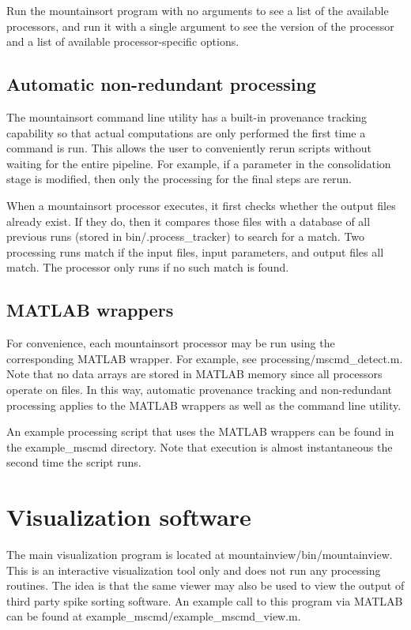\documentclass[hidelinks,10pt]{article}
\begin{document}
Run the mountainsort program with no arguments to see a list of the available processors, and run it with a single argument to see the version of the processor and a list of available processor-specific options.

\subsection {Automatic non-redundant processing}

The mountainsort command line utility has a built-in provenance tracking capability so that actual computations are only performed the first time a command is run. This allows the user to conveniently rerun scripts without waiting for the entire pipeline. For example, if a parameter in the consolidation stage is modified, then only the processing for the final steps are rerun.

When a mountainsort processor executes, it first checks whether the output files already exist. If they do, then it compares those files with a database of all previous runs (stored in bin/.process\_tracker) to search for a match. Two processing runs match if the input files, input parameters, and output files all match. The processor only runs if no such match is found.

\subsection {MATLAB wrappers}

For convenience, each mountainsort processor may be run using the corresponding MATLAB wrapper. For example, see processing/mscmd\_detect.m. Note that no data arrays are stored in MATLAB memory since all processors operate on files. In this way, automatic provenance tracking and non-redundant processing applies to the MATLAB wrappers as well as the command line utility.

An example processing script that uses the MATLAB wrappers can be found in the example\_mscmd directory. Note that execution is almost instantaneous the second time the script runs.

\section {Visualization software}

The main visualization program is located at mountainview/bin/mountainview. This is an interactive visualization tool only and does not run any processing routines. The idea is that the same viewer may also be used to view the output of third party spike sorting software. An example call to this program via MATLAB can be found at example\_mscmd/example\_mscmd\_view.m.
\end{document}
